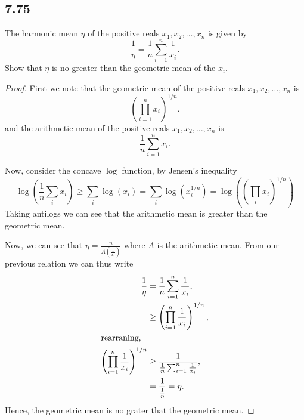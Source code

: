 \documentclass{article}
\begin{document}
\subsection*{7.75}
The harmonic mean $\eta$ of the positive reals $x_1, x_2,\dots,x_n$ is given by
\begin{equation*}
    \frac{1}{\eta} = \frac{1}{n}\sum_{i=1}^n \frac{1}{x_i}.
\end{equation*}
Show that $\eta$ is no greater than the geometric mean of the $x_i$.

\begin{proof}
    First we note that the geometric mean of the positive reals
    ${x_1, x_2,\dots,x_n}$ is
    \begin{equation*}
        \left(\prod_{i=1}^n x_i\right)^{1/n}.
    \end{equation*}
    and the arithmetic mean of the positive reals
    ${x_1, x_2,\dots,x_n}$ is
    \begin{equation*}
        \frac{1}{n}\sum_{i=1}^n x_i.
    \end{equation*}

    Now, consider the concave $\log$ function, by Jensen's inequality
    \begin{equation*}
        \log\left(\frac{1}{n}\sum_{i}x_i\right) \geq \sum_i \log(x_i)
        = \sum_i \log(x_i^{1/n}) = \log\left(\left(\prod_i x_i\right)^{1/n}\right)
    \end{equation*}
    Taking antilogs we can see that the arithmetic mean is greater than
    the geometric mean.

    Now, we can see that $\eta = \frac{n}{A(\frac{1}{x_i})}$ where $A$ is the
    arithmetic mean. From our previous relation we can thus write
    \begin{align*}
        \frac{1}{\eta}                                 & = \frac{1}{n}\sum_{i=1}^n\frac{1}{x_i},              \\
                                                       & \geq \left(\prod_{i=1}^n \frac{1}{x_i}\right)^{1/n}, \\
        \intertext{rearraning,}
        \left(\prod_{i=1}^n \frac{1}{x_i}\right)^{1/n} & \geq \frac{1}{\frac{1}{n}\sum_{i=1}^n\frac{1}{x_i}}, \\
                                                       & = \frac{1}{\frac{1}{\eta}} = \eta.
    \end{align*}
    Hence, the geometric mean is no grater that the geometric mean.
\end{proof}
\end{document}
